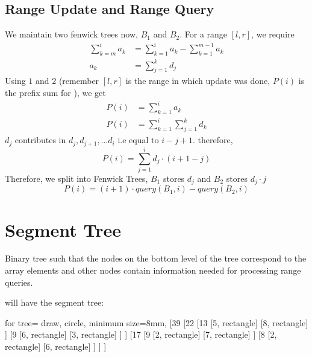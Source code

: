\documentclass{article}
\begin{document}
	\subsection{Range Update and Range Query}
	We maintain two fenwick trees now, $B_1$ and $B_2$. For a range $[l,r]$, we require 
	\begin{align}
		\sum_{k=m}^{i} a_k &= \sum_{k=1}^{i} a_k - \sum_{k=1}^{m-1} a_k \\
		a_k &= \sum_{j=1}^{k} d_j
	\end{align}
	\vspace{1mm}
	Using $1$ and $2$ (remember $[l,r]$ is the range in which update was done, $P(i)$ is the prefix sum for ), we get
	\begin{align*}
		P(i) &= \sum_{k=1}^{i} a_k \\
		P(i) &= \sum_{k=1}^{i} \sum_{j=1}^{k} d_k
	\end{align*}
	$d_j$ contributes in $d_j, d_{j+1}, \ldots d_i$ i.e equal to $i - j + 1$.
	therefore, 
	\[
	P(i) = \sum_{j=1}^{i} d_j \cdot (i+1-j)
	\]
	Therefore, we split into Fenwick Trees, $B_1$ stores $d_j$ and $B_2$ stores $d_j \cdot j$
	\[
	P(i) = (i+1) \cdot query(B_1,i) -  query(B_2,i)
	\]
	
	\section{Segment Tree}
	Binary tree such that the nodes on the bottom level of the tree correspond to the array elements and other nodes contain information needed for processing range queries. \newline
	
	\begin{center}
	\end{center}

	will have the segment tree: \newline
	
	\begin{center}
		\begin{forest}
			for tree={
				draw,
				circle,
				minimum size=8mm,
			}
			[39
			[22
			[13
			[{5}, rectangle]
			[{8}, rectangle]
			]
			[9
			[{6}, rectangle]
			[{3}, rectangle]
			]
			]
			[17
			[9
			[{2}, rectangle]
			[{7}, rectangle]
			]
			[8
			[{2}, rectangle]
			[{6}, rectangle]
			]
			]
			]
		\end{forest}
	\end{center}
\end{document}
